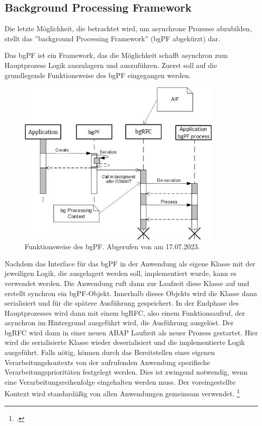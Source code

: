 \subsection{Background Processing Framework}

Die letzte Möglichkeit, die betrachtet wird, um asynchrone Prozesse abzubilden, stellt das ''background Processing Framework'' (bgPF abgekürzt) dar.

Das bgPF ist ein Framework, das die Möglichkeit schafft asynchron zum Hauptprozess Logik auszulagern und auszuführen. Zuerst soll auf die grundlegende Funktionsweise des bgPF eingegangen werden.

\begin{figure}[H]
 \centering
 \includegraphics[height=8cm]{Bilder/bgPF_Schema.png}
 \caption[Funktionsweise des bgPF]{Funktionsweise des bgPF. Abgerufen von \cite{sap_bgpf_2023} am 17.07.2023.}
 \label{fig:iso_norm}
\end{figure}

Nachdem das Interface für das bgPF in der Anwendung als eigene Klasse mit der jeweiligen Logik, die ausgelagert werden soll, implementiert wurde, kann es verwendet werden. Die Anwendung ruft dann zur Laufzeit diese Klasse auf und erstellt synchron ein bgPF-Objekt. Innerhalb dieses Objekts wird die Klasse dann serialisiert und für die spätere Ausführung gespeichert. In der Endphase des Hauptprozesses wird dann mit einem bgRFC, also einem Funktionsaufruf, der asynchron im Hintergrund ausgeführt wird, die Ausführung ausgelöst. Der bgRFC wird dann in einer neuen ABAP Laufzeit als neuer Prozess gestartet. Hier wird die serialisierte Klasse wieder deserialisiert und die implementierte Logik ausgeführt. Falls nötig, können durch das Bereitstellen eines eigenen Verarbeitungskontexts von der aufrufenden Anwendung spezifische Verarbeitungsprioritäten festgelegt werden. Dies ist zwingend notwendig, wenn eine Verarbeitungsreihenfolge eingehalten werden muss. Der voreingestellte Kontext wird standardä{\ss}ig von allen Anwendungen gemeinsam verwendet. \footcite[Vgl.][]{sap_bgpf_2023}

